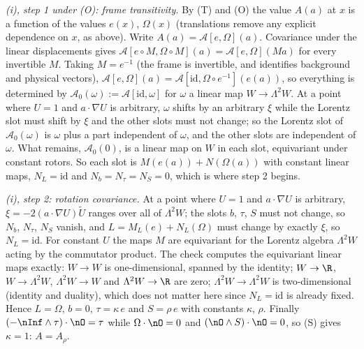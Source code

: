 \emph{(i), step 1 under (O): frame transitivity.} By (T) and (O) the value $A(a)$ at $x$ is a function of the values $e(x)$, $\Omega(x)$ (translations remove any explicit dependence on $x$, as above). Write $A(a) = \mathcal{A}[e, \Omega](a)$. Covariance under the linear displacements gives $\mathcal{A}[e \circ M, \Omega \circ M](a) = \mathcal{A}[e, \Omega](Ma)$ for every invertible $M$. Taking $M = e^{-1}$ (the frame is invertible, and identifies background and physical vectors), $\mathcal{A}[e, \Omega](a) = \mathcal{A}[\mathrm{id}, \Omega \circ e^{-1}](e(a))$, so everything is determined by $\mathcal{A}_{0}(\omega) := \mathcal{A}[\mathrm{id}, \omega]$ for $\omega$ a linear map $W \to \Lambda^{2}W$. At a point where $U = 1$ and $a \cdot \nabla U$ is arbitrary, $\omega$ shifts by an arbitrary $\xi$ while the Lorentz slot must shift by $\xi$ and the other slots must not change; so the Lorentz slot of $\mathcal{A}_{0}(\omega)$ is $\omega$ plus a part independent of $\omega$, and the other slots are independent of $\omega$. What remains, $\mathcal{A}_{0}(0)$, is a linear map on $W$ in each slot, equivariant under constant rotors. So each slot is $M(e(a)) + N(\Omega(a))$ with constant linear maps, $N_{L} = \mathrm{id}$ and $N_{b} = N_{\tau} = N_{S} = 0$, which is where step 2 begins.

\emph{(i), step 2: rotation covariance.} At a point where $U = 1$ and $a \cdot \nabla U$ is arbitrary, $\xi = -2(a \cdot \nabla U)\tilde U$ ranges over all of $\Lambda^{2}W$; the slots $b$, $\tau$, $S$ must not change, so $N_{b}$, $N_{\tau}$, $N_{S}$ vanish, and $L = M_{L}(e) + N_{L}(\Omega)$ must change by exactly $\xi$, so $N_{L} = \mathrm{id}$. For constant $U$ the maps $M$ are equivariant for the Lorentz algebra $\Lambda^{2}W$ acting by the commutator product. The check computes the equivariant linear maps exactly: $W \to W$ is one-dimensional, spanned by the identity; $W \to \R$, $W \to \Lambda^{2}W$, $\Lambda^{2}W \to W$ and $\Lambda^{2}W \to \R$ are zero; $\Lambda^{2}W \to \Lambda^{2}W$ is two-dimensional (identity and duality), which does not matter here since $N_{L} = \mathrm{id}$ is already fixed. Hence $L = \Omega$, $b = 0$, $\tau = \kappa\, e$ and $S = \rho\, e$ with constants $\kappa$, $\rho$. Finally $(-\nInf \wedge \tau) \cdot \nO = \tau$ while $\Omega \cdot \nO = 0$ and $(\nO \wedge S) \cdot \nO = 0$, so (S) gives $\kappa = 1$: $A = A_{\rho}$.

